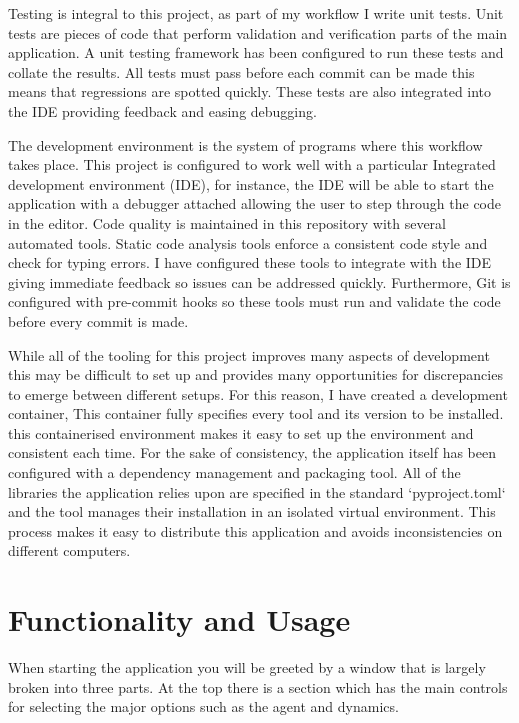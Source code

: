 \documentclass[]{final_report}
\begin{document}
Testing is integral to this project, as part of my workflow I write unit tests. Unit tests are pieces of code that perform validation and verification parts of the main application.  A unit testing framework has been configured to run these tests and collate the results. All tests must pass before each commit can be made this means that regressions are spotted quickly. These tests are also integrated into the IDE providing feedback and easing debugging.

The development environment is the system of programs where this workflow takes place. This project is configured to work well with a particular Integrated development environment (IDE), for instance, the IDE will be able to start the application with a debugger attached allowing the user to step through the code in the editor. Code quality is maintained in this repository with several automated tools. Static code analysis tools enforce a consistent code style and check for typing errors. I have configured these tools to integrate with the IDE giving immediate feedback so issues can be addressed quickly. Furthermore, Git is configured with pre-commit hooks so these tools must run and validate the code before every commit is made.

While all of the tooling for this project improves many aspects of development this may be difficult to set up and provides many opportunities for discrepancies to emerge between different setups. For this reason, I have created a development container, This container fully specifies every tool and its version to be installed. this containerised environment makes it easy to set up the environment and consistent each time. For the sake of consistency, the application itself has been configured with a dependency management and packaging tool. All of the libraries the application relies upon are specified in the standard `pyproject.toml` and the tool manages their installation in an isolated virtual environment. This process makes it easy to distribute this application and avoids inconsistencies on different computers.


\section{Functionality and Usage}

When starting the application you will be greeted by a window that is largely broken into three parts. At the top there is a section which has the main controls for selecting the major options such as the agent and dynamics. 
\end{document}
